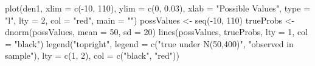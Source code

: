 \begin{Schunk}
\begin{Sinput}
 plot(den1, xlim = c(-10, 110), ylim = c(0, 
     0.03), xlab = "Possible Values", type = "l", 
     lty = 2, col = "red", main = "")
 possValues <- seq(-10, 110)
 trueProbs <- dnorm(possValues, mean = 50, 
     sd = 20)
 lines(possValues, trueProbs, lty = 1, col = "black")
 legend("topright", legend = c("true under N(50,400)", 
     "observed in sample"), lty = c(1, 2), 
     col = c("black", "red"))
\end{Sinput}
\end{Schunk}
